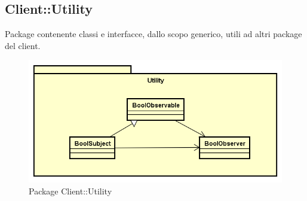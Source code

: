 \subsection{Client::Utility}
Package contenente classi e interfacce, dallo scopo generico, utili ad altri package del client.
\begin{figure}[h] \centering \includegraphics[width=\textwidth,height=\textheight,keepaspectratio]{images/diagrams/client/Client/Utility.png}
	\caption{Package Client::Utility}
\end{figure}
\newpage
